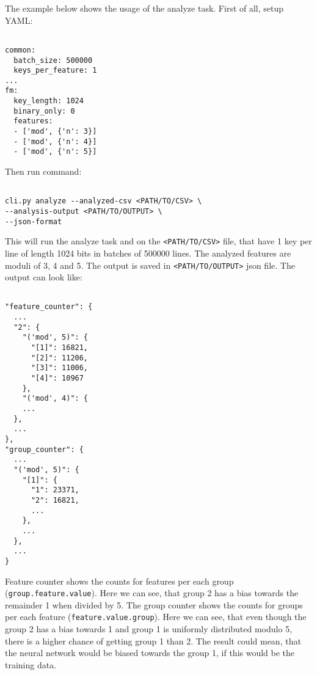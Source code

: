 \noindent
The example below shows the usage of the analyze task. First of all, setup YAML:

\begin{verbatim}

common:
  batch_size: 500000
  keys_per_feature: 1
...  
fm:
  key_length: 1024
  binary_only: 0
  features:
  - ['mod', {'n': 3}]
  - ['mod', {'n': 4}]
  - ['mod', {'n': 5}]

\end{verbatim}

\noindent
Then run command:

\begin{verbatim}

cli.py analyze --analyzed-csv <PATH/TO/CSV> \
--analysis-output <PATH/TO/OUTPUT> \
--json-format

\end{verbatim}

\noindent
This will run the analyze task and on the \texttt{<PATH/TO/CSV>} file, that have 1 key per line of length 1024 bits in batches of 500000 lines. The analyzed features are moduli of 3, 4 and 5. The output is saved in \texttt{<PATH/TO/OUTPUT>} json file. The output can look like:

\begin{verbatim}

"feature_counter": {
  ...
  "2": {
    "('mod', 5)": {
      "[1]": 16821,
      "[2]": 11206,
      "[3]": 11006,
      "[4]": 10967      
    },
    "('mod', 4)": {
    ...  
  },
  ...
},
"group_counter": {
  ...
  "('mod', 5)": {
    "[1]": {
      "1": 23371,
      "2": 16821,
      ...
    },
    ...
  },
  ...
}  

\end{verbatim}

\noindent
Feature counter shows the counts for features per each group (\texttt{group.feature.value}). Here we can see, that group 2 has a bias towards the remainder 1 when divided by 5. The group counter shows the counts for groups per each feature (\texttt{feature.value.group}). Here we can see, that even though the group 2 has a bias towards 1 and group 1 is uniformly distributed modulo 5, there is a higher chance of getting group 1 than 2. The result could mean, that the neural network would be biased towards the group 1, if this would be the training data.


